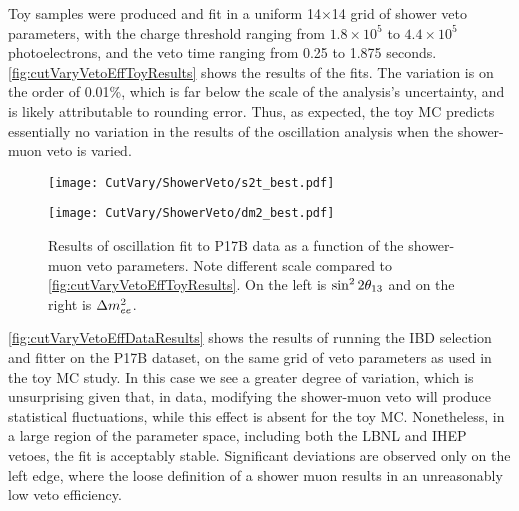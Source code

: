 \documentclass[../thesis.tex]{subfiles}
\begin{document}
Toy samples were produced and fit in a uniform 14$\times$14 grid of shower veto parameters, with the charge threshold ranging from $1.8\times10^5$ to $4.4\times10^5$ photoelectrons, and the veto time ranging from 0.25 to 1.875 seconds. \autoref{fig:cutVaryVetoEffToyResults} shows the results of the fits. The variation is on the order of 0.01\%, which is far below the scale of the analysis's uncertainty, and is likely attributable to rounding error. Thus, as expected, the toy MC predicts essentially no variation in the results of the oscillation analysis when the shower-muon veto is varied.

\begin{figure}[ht]
  \begin{minipage}{0.5\linewidth}%
    \texttt{[image: CutVary/ShowerVeto/s2t\_best.pdf]}%
  \end{minipage}%
  \begin{minipage}{0.5\linewidth}%
    \texttt{[image: CutVary/ShowerVeto/dm2\_best.pdf]}%
  \end{minipage}%
  \caption{Results of oscillation fit to P17B data as a function of the shower-muon veto parameters. Note different scale compared to \autoref{fig:cutVaryVetoEffToyResults}. On the left is $\sin^2 2\theta_{13}$ and on the right is $\Delta m^2_{ee}$. \marknom}
  \label{fig:cutVaryVetoEffDataResults}
\end{figure}

\autoref{fig:cutVaryVetoEffDataResults} shows the results of running the IBD selection and fitter on the P17B dataset, on the same grid of veto parameters as used in the toy MC study. In this case we see a greater degree of variation, which is unsurprising given that, in data, modifying the shower-muon veto will produce statistical fluctuations, while this effect is absent for the toy MC. Nonetheless, in a large region of the parameter space, including both the LBNL and IHEP vetoes, the fit is acceptably stable. Significant deviations are observed only on the left edge, where the loose definition of a shower muon results in an unreasonably low veto efficiency.

\newcommand\fourShowerNote{The optimal (lowest) uncertainty is marked with a white star. \marknom\ The bottom plots use alternative color scales chosen to highlight details near the nominal and optimum cuts.}
\end{document}
